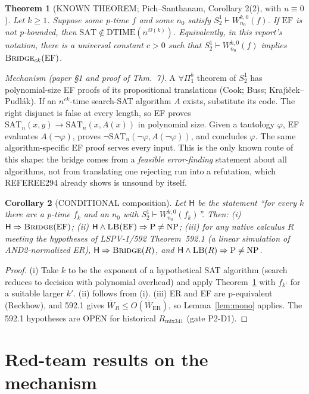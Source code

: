 \documentclass[11pt]{article}
\newtheorem{theorem}{Theorem}
\newtheorem{corollary}[theorem]{Corollary}
\theoremstyle{definition}
\newcommand{\Wbar}{\overline W}
\newcommand{\SAT}{\mathrm{SAT}}
\newcommand{\EF}{\mathrm{EF}}
\newcommand{\Time}{\mathrm{DTIME}}
\begin{document}
\begin{theorem}[KNOWN THEOREM; Pich--Santhanam, Corollary 2(2), with $u\equiv 0$]\label{thm:ps}
Let $k\ge1$. Suppose some p-time $f$ and some $n_0$ satisfy $S^1_2\vdash W^{k,0}_{n_0}(f)$.
If $\EF$ is not p-bounded, then $\SAT\notin\Time(n^{\Omega(k)})$.
Equivalently, in this report's notation, there is a universal constant $c>0$ such that
$S^1_2\vdash W^{k,0}_{n_0}(f)$ implies $\textsc{Bridge}_{ck}(\EF)$.
\end{theorem}
\noindent\emph{Mechanism (paper \S1 and proof of Thm.~7).} A $\forall\Pi^b_1$ theorem of
$S^1_2$ has polynomial-size EF proofs of its propositional translations (Cook; Buss;
Kraj\'{\i}\v{c}ek--Pudl\'ak). If an $n^{ck}$-time search-SAT algorithm $A$ exists, substitute
its code. The right disjunct is false at every length, so EF proves
$\SAT_n(x,y)\to\SAT_n(x,A(x))$ in polynomial size. Given a tautology $\varphi$, EF evaluates
$A(\neg\varphi)$, proves $\neg\SAT_n(\neg\varphi,A(\neg\varphi))$, and concludes $\varphi$.
The same algorithm-specific EF proof serves every input. This is the only known route of this
shape: the bridge comes from a \emph{feasible error-finding} statement about all algorithms,
not from translating one rejecting run into a refutation, which REFEREE294 already shows is
unsound by itself.

\begin{corollary}[CONDITIONAL composition]\label{cor:compose}
Let $\mathsf H$ be the statement ``for every $k$ there are a p-time $f_k$ and an $n_0$ with
$S^1_2\vdash W^{k,0}_{n_0}(f_k)$''. Then:
(i) $\mathsf H\Rightarrow\textsc{Bridge}(\EF)$;
(ii) $\mathsf H\wedge\textsc{LB}(\EF)\Rightarrow\mathrm P\ne\mathrm{NP}$;
(iii) for any native calculus $R$ meeting the hypotheses of LSPV-1/592 Theorem~592.1 (a linear
simulation of AND2-normalized ER), $\mathsf H\Rightarrow\textsc{Bridge}(R)$, and
$\mathsf H\wedge\textsc{LB}(R)\Rightarrow\mathrm P\ne\mathrm{NP}$.
\end{corollary}
\begin{proof}
(i) Take $k$ to be the exponent of a hypothetical SAT algorithm (search reduces to decision
with polynomial overhead) and apply Theorem~\ref{thm:ps} with $f_{k'}$ for a suitable larger
$k'$. (ii) follows from (i). (iii) ER and EF are p-equivalent (Reckhow), and 592.1 gives
$\Wbar_R\le O(\Wbar_{\mathrm{ER}})$, so Lemma~\ref{lem:mono} applies. The 592.1 hypotheses are
OPEN for historical $R_{\mathrm{mix341}}$ (gate P2-D1).
\end{proof}

\section{Red-team results on the mechanism}
\end{document}
